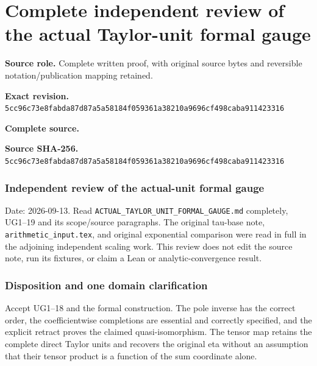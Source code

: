 \begingroup

\section{Complete independent review of the actual Taylor-unit formal gauge}


\begingroup
\sloppy
\small

\noindent\textbf{Source role.} Complete written proof, with original source bytes and reversible notation/publication mapping retained.\par
\noindent\textbf{Exact revision.} \nolinkurl{5cc96c73e8fabda87d87a5a58184f059361a38210a9696cf498caba911423316}\par
\noindent\textbf{Complete source.} \par
\noindent\textbf{Source SHA-256.} \nolinkurl{5cc96c73e8fabda87d87a5a58184f059361a38210a9696cf498caba911423316}\par\medskip
\subsubsection{Independent review of the actual-unit formal gauge}\label{endpoint-f1_unit_gauge_review--independent-review-of-the-actual-unit-formal-gauge}

Date: 2026-09-13. Read \nolinkurl{ACTUAL_TAYLOR_UNIT_FORMAL_GAUGE.md} completely, UG1--19 and its scope/source paragraphs. The original tau-base note, \nolinkurl{arithmetic_input.tex}, and original exponential comparison were read in full in the adjoining independent scaling work. This review does not edit the source note, run its fixtures, or claim a Lean or analytic-convergence result.

\subsubsection{Disposition and one domain clarification}\label{endpoint-f1_unit_gauge_review--disposition-and-one-domain-clarification}

Accept UG1--18 and the formal construction. The pole inverse has the correct order, the coefficientwise completions are essential and correctly specified, and the explicit retract proves the claimed quasi-isomorphism. The tensor map retains the complete direct Taylor units and recovers the original eta without an assumption that their tensor product is a function of the sum coordinate alone.

